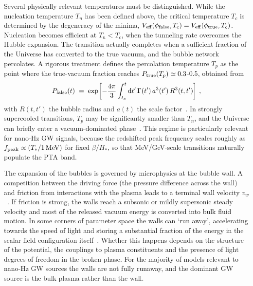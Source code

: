 \documentclass[a4paper,11pt]{article}
\begin{document}
Several physically relevant temperatures must be distinguished. While the nucleation temperature $T_n$ 
has been defined above, the critical temperature $T_c$ is determined by the degeneracy of the minima, 
$V_{\rm eff}(\phi_{\rm false},T_c) = V_{\rm eff}(\phi_{\rm true},T_c)$. Nucleation becomes efficient 
at $T_n < T_c$, when the tunneling rate overcomes the Hubble expansion. The transition actually 
completes when a sufficient fraction of the Universe has converted to the true vacuum, and 
the bubble network percolates. A rigorous treatment defines the percolation temperature $T_p$ 
as the point where the true-vacuum fraction reaches $P_{\rm true}(T_p) \simeq 0.3$-$0.5$, 
obtained from
\begin{equation}
  P_{\rm false}(t) \;=\; \exp\!\left[-\frac{4\pi}{3}
  \int_{t_c}^{t} {\rm d}t' \,\Gamma(t')\, a^3(t')\, R^3(t,t')\right]\,,
\end{equation}
with $R(t,t')$ the bubble radius and $a(t)$ the scale factor~\citep{Turner:1992tz,Ellis:2020nnr}.
In strongly supercooled transitions, $T_p$ may be significantly smaller than $T_n$, and the Universe can briefly enter 
a vacuum-dominated phase~\citep{Espinosa:2010hh,Ellis:2019oqb,Athron:2022mmm}. This regime is particularly relevant 
for nano-Hz GW signals, because the redshifted peak frequency scales roughly as $f_{\rm peak} \propto (T_*/1\,{\rm MeV})$ 
for fixed $\beta/H_*$, so that MeV/GeV-scale transitions naturally populate the PTA band.

The expansion of the bubbles is governed by microphysics at the bubble wall. A competition between the driving 
force (the pressure difference across the wall) and friction from interactions with the plasma leads to a terminal 
wall velocity $v_w$~\citep{Moore:1995si,Konstandin:2014zta}. If friction is strong, the walls reach a subsonic 
or mildly supersonic steady velocity and most of the released vacuum energy is converted into bulk fluid motion. 
In some corners of parameter space the walls can `run away', accelerating towards the speed of light and 
storing a substantial fraction of the energy in the scalar field configuration itself~\citep{Bodeker:2009qy}.
Whether this happens depends on the structure of the potential, the couplings to plasma constituents and the presence of 
light degrees of freedom in the broken phase. For the majority of models relevant to nano-Hz GW sources the walls are 
not fully runaway, and the dominant GW source is the bulk plasma rather than the wall.
\end{document}
